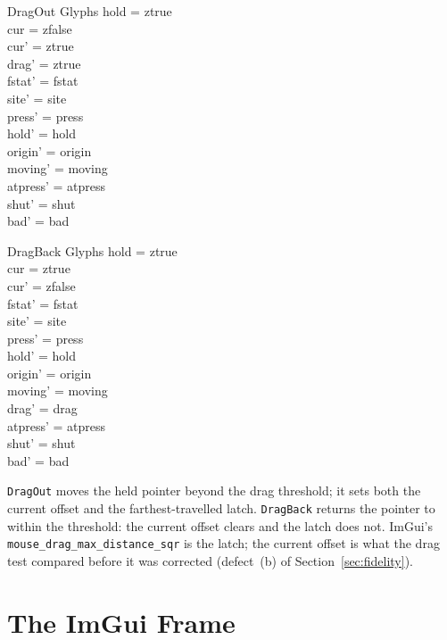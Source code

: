 \documentclass[a4paper,10pt,fleqn]{article}
\begin{document}
\begin{schema}{DragOut}
  \Delta Glyphs
\where
  hold = ztrue \\
  cur = zfalse \\
  cur' = ztrue \\
  drag' = ztrue \\
  fstat' = fstat \\
  site' = site \\
  press' = press \\
  hold' = hold \\
  origin' = origin \\
  moving' = moving \\
  atpress' = atpress \\
  shut' = shut \\
  bad' = bad
\end{schema}

\begin{schema}{DragBack}
  \Delta Glyphs
\where
  hold = ztrue \\
  cur = ztrue \\
  cur' = zfalse \\
  fstat' = fstat \\
  site' = site \\
  press' = press \\
  hold' = hold \\
  origin' = origin \\
  moving' = moving \\
  drag' = drag \\
  atpress' = atpress \\
  shut' = shut \\
  bad' = bad
\end{schema}

\texttt{DragOut} moves the held pointer beyond the drag threshold; it sets
both the current offset and the farthest-travelled latch.  \texttt{DragBack}
returns the pointer to within the threshold: the current offset clears and the
latch does not.  ImGui's \texttt{mouse\_drag\_max\_distance\_sqr} is the latch;
the current offset is what the drag test compared before it was corrected
(defect~(b) of Section~\ref{sec:fidelity}).

\section{The ImGui Frame}
\label{sec:frame}
\end{document}
